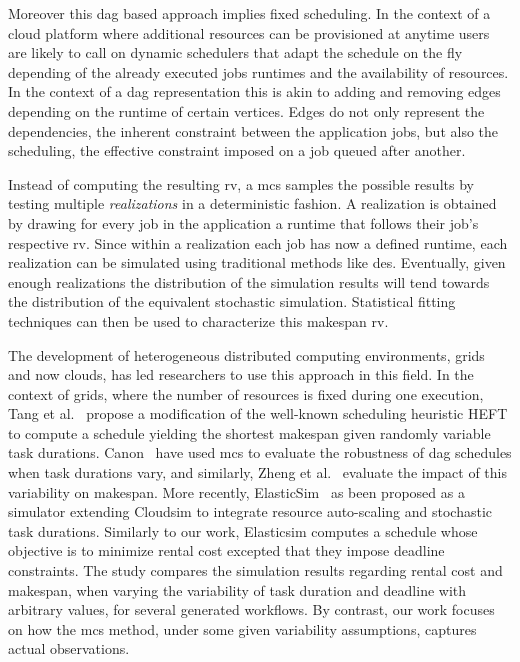 \documentclass[10pt,conference,compsocconf]{IEEEtran}
\begin{document}
Moreover this \ac{dag} based approach implies fixed scheduling. In the context
of a cloud platform where additional resources can be provisioned at anytime
users are likely to call on dynamic schedulers that adapt the schedule on the fly
depending of the already executed jobs runtimes and the availability of
resources. In the context of a \ac{dag} representation this is akin to adding
and removing edges depending on the runtime of certain vertices. Edges do not
only represent the dependencies, the inherent constraint between the application
jobs, but also the scheduling, the effective constraint imposed on a job queued
after another.


Instead  of computing  the resulting  \ac{rv}, a  \ac{mcs} samples  the possible
results by testing  multiple \emph{realizations} in a  deterministic fashion.  A
realization is  obtained by drawing for  every job in the  application a runtime
that follows their job's respective \ac{rv}. Since within a realization each job
has now a  defined runtime, each realization can be  simulated using traditional
methods like \ac{des}.  Eventually, given enough realizations the distribution of
the simulation  results will  tend towards the  distribution of  the equivalent
stochastic  simulation.  Statistical  fitting  techniques can  then  be used  to
characterize this makespan \ac{rv}.

The development  of heterogeneous distributed computing  environments, grids and
now clouds,  has led  researchers to use  this approach in  this field.   In the
context of grids,  where the number of resources is  fixed during one execution,
Tang et  al.~\cite{Tang11} propose a  modification of the  well-known scheduling
heuristic  HEFT to  compute  a  schedule yielding  the  shortest makespan  given
randomly  variable task  durations. Canon~\cite{Canon10}  have used  \ac{mcs} to
evaluate  the robustness  of \ac{dag}  schedules when  task durations  vary, and
similarly, Zheng et  al.~\cite{Zheng13} evaluate the impact  of this variability
on  makespan.  More  recently,  ElasticSim~\cite{Cai17} as  been  proposed as  a
simulator extending  Cloudsim to integrate resource  auto-scaling and stochastic
task  durations. Similarly  to our  work, Elasticsim  computes a  schedule whose
objective  is  to  minimize  rental  cost excepted  that  they  impose  deadline
constraints.  The  study compares the  simulation results regarding  rental cost
and makespan,  when varying the variability  of task duration and  deadline with
arbitrary  values,  for  several  generated workflows.  By  contrast,  our  work
focuses on how the \ac{mcs} method, under some given variability assumptions, 
captures actual observations.
\end{document}
